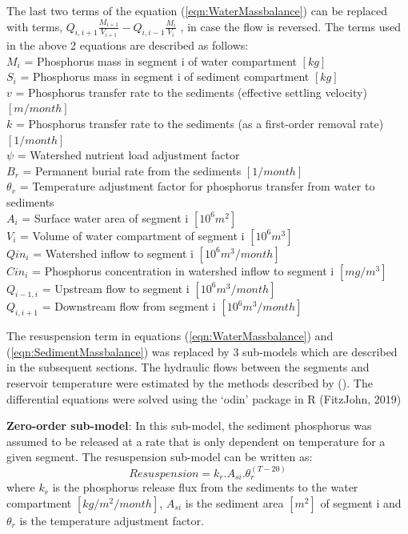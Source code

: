 \documentclass[fleqn]{article}
\newcommand{\mycite}[1]{\citeauthor{#1} (\citeyear{#1})}
\begin{document}
The last two terms of the equation (\ref{eqn:WaterMassbalance}) can be replaced with terms, $Q_{i,i+1}\frac{M_{i+1}}{V_{i+1}}-Q_{i,i-1}\frac{M_i}{V_i}$ , in case the flow is reversed. The terms used in the above 2 equations are described as follows:\\
$M_i$ = Phosphorus mass in segment i of water compartment $[kg]$ \\
$S_i$ = Phosphorus mass in segment i of sediment compartment $[kg]$ \\
$v$ = Phosphorus transfer rate to the sediments (effective settling velocity) $[m/month]$\\
$k$ = Phosphorus transfer rate to the sediments (as a first-order removal rate) $[1/month]$\\
$\psi$ = Watershed nutrient load adjustment factor\\$B_r$ = Permanent burial rate from the sediments $[1/month]$\\
$\theta_v$ = Temperature adjustment factor for phosphorus transfer from water to sediments\\
$A_i$ = Surface water area of segment i $[10^6 m^2]$\\$V_i$ = Volume of water compartment of segment i $[10^6 m^3]$ \\
$Qin_i$ = Watershed inflow to segment i $[10^6 m^3/month]$ \\
$Cin_i$ = Phosphorus concentration in watershed inflow to segment i $[mg/m^3]$\\
$Q_{i-1,i}$ = Upstream flow to segment i $[10^6m^3/month]$ \\
$Q_{i,i+1}$ = Downstream flow from segment i $[10^6m^3/month]$

The resuspension term in equations (\ref{eqn:WaterMassbalance}) and (\ref{eqn:SedimentMassbalance}) was replaced by 3 sub-models which are described in the subsequent sections. The hydraulic flows between the segments and reservoir temperature were estimated by the methods described by \mycite{DelGuidice2019}. The differential equations were solved using the ‘odin’ package in R (FitzJohn, 2019)

\textbf{Zero-order sub-model}: In this sub-model, the sediment phosphorus was assumed to be released at a rate that is only dependent on temperature for a given segment. The resuspension sub-model can be written as:
\begin{equation}
    Resuspension = k_r.A_{si}.\theta_r^{(T-20)}
    \label{eqn:ZeroOrderModel}
\end{equation}
where $k_r$ is the phosphorus release flux from the sediments to the water compartment $[kg/m^2/month]$, $A_{si}$ is the sediment area $[m^2]$ of segment i and $\theta_r$ is the temperature adjustment factor. 
\end{document}
